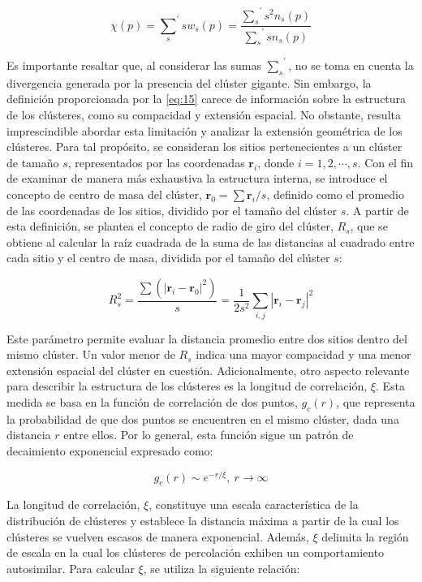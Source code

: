 \begin{equation}\label{eq:15}
\chi(p)={\sum_{s}}^{\prime}{sw_s(p)}=\frac{{\sum_{s}}^{\prime}{s^2n_s(p)}}{{\sum_{s}}^{\prime}{sn_s(p)}}
\end{equation}

Es importante resaltar que, al considerar las sumas ${\sum_{s}}^{\prime}$, no se toma en cuenta la divergencia generada por la presencia del clúster gigante. Sin embargo, la definición proporcionada por la \cref{eq:15} carece de información sobre la estructura de los clústeres, como su compacidad y extensión espacial. No obstante, resulta imprescindible abordar esta limitación y analizar la extensión geométrica de los clústeres. Para tal propósito, se consideran los sitios pertenecientes a un clúster de tamaño $s$, representados por las coordenadas $\mathbf{r}_i$, donde $i = 1, 2,\cdots,s$. Con el fin de examinar de manera más exhaustiva la estructura interna, se introduce el concepto de centro de masa del clúster, $\mathbf{r}_0 = \sum{\mathbf{r}_i}/s$, definido como el promedio de las coordenadas de los sitios, dividido por el tamaño del clúster $s$. A partir de esta definición, se plantea el concepto de radio de giro del clúster, $R_s$, que se obtiene al calcular la raíz cuadrada de la suma de las distancias al cuadrado entre cada sitio y el centro de masa, dividida por el tamaño del clúster $s$:

\begin{equation}\label{eq:19}
R_s^2=	\frac{\sum{\left(\left| \mathbf{r}_i-\mathbf{r}_0\right|^2 \right)}}{s}=\frac{1}{2s^2}\sum_{i,j}{\left|\mathbf{r}_i-\mathbf{r}_j\right|^2}
\end{equation}

Este parámetro permite evaluar la distancia promedio entre dos sitios dentro del mismo clúster. Un valor menor de $R_s$ indica una mayor compacidad y una menor extensión espacial del clúster en cuestión. Adicionalmente, otro aspecto relevante para describir la estructura de los clústeres es la longitud de correlación, $\xi$. Esta medida se basa en la función de correlación de dos puntos, $g_c(r )$, que representa la probabilidad de que dos puntos se encuentren en el mismo clúster, dada una distancia $r$ entre ellos. Por lo general, esta función sigue un patrón de decaimiento exponencial expresado como:


\begin{equation}\label{eq:16}
g_c(r) \sim e^{-r/\xi},  \ r\to\infty
\end{equation}

La longitud de correlación, $\xi$, constituye una escala característica de la distribución de clústeres y establece la distancia máxima a partir de la cual los clústeres se vuelven escasos de manera exponencial. Además, $\xi$ delimita la región de escala en la cual los clústeres de percolación exhiben un comportamiento autosimilar. Para calcular $\xi$, se utiliza la siguiente relación:

